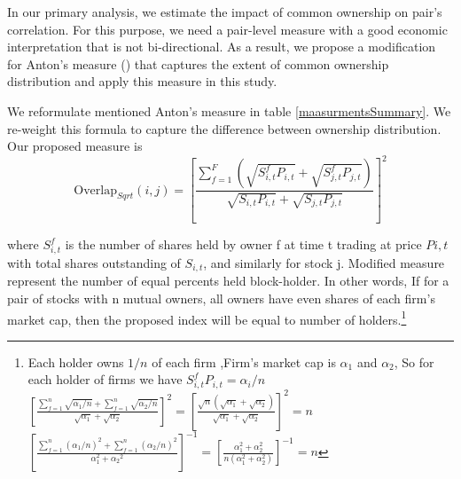 In our primary analysis, we estimate the impact of common ownership on pair's correlation. For this purpose, we need a pair-level measure with a good economic interpretation that is not bi-directional. As a result, we propose a modification for Anton's measure (\cite{AntonPolk}) that captures the extent of common ownership distribution and apply this measure in this study.

We reformulate mentioned Anton's measure in table \ref{maasurmentsSummary}.
We re-weight this formula to capture the difference between ownership distribution. Our proposed measure is
\begin{equation}
	\text{Overlap}_{Sqrt}(i, j) =  [\frac{\sum_{f =1}^{F}(\sqrt{S^f_{i,t}P_{i,t}}+\sqrt{S^f_{j,t}P_{j,t}})}{\sqrt{S_{i,t}P_{i,t}} + \sqrt{S_{j,t}P_{j,t}}}]^2 
	\label{sqrt}
\end{equation}

where $ S^f_{i,t}$ is the number of shares held by owner f
at time t trading at price $ P{i,t} $ with total shares outstanding of $ S_{i,t} $, and similarly for stock j. Modified measure represent the number of equal percents held block-holder. In other words, If for a pair of stocks with n mutual owners, all owners have even shares of each firm's market cap, then the proposed index will be equal to number of holders.\footnote{ 
	Each holder owns $ 1/n $ of each firm ,Firm's market cap is $ \alpha_1 $ and $ \alpha_2 $, So for each holder of firms we have $ S^f_{i,t}P_{i,t} = \alpha_i/n $\\
	$
	[  \frac{\sum_{f=1}^{n} \sqrt{\alpha_1/n}+\sum_{f=1}^{n} \sqrt{\alpha_2/n}}{\sqrt{\alpha_1} + \sqrt{\alpha_2}}]^2 
	= [\frac{\sqrt{n}(\sqrt{\alpha_1} +\sqrt{\alpha_2 })}{\sqrt{\alpha_1} + \sqrt{\alpha_2}}]^2 = n $
	\\
	$
	[\frac{\sum_{f=1}^{n} {(\alpha_1/n)^2}+\sum_{f=1}^{n} {(\alpha_2/n)^2}}{\alpha_1^2 +{\alpha_2}^2}]^{-1} = [\frac{{\alpha_1^2 + \alpha_2^2 }}{n(\alpha_1^2 + \alpha_2^2)}]^{-1} = n
	$
}

